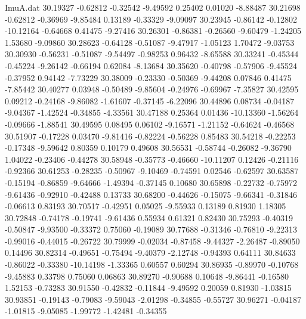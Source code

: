 \begin{filecontents}{ImuA.dat}
  30.19327   -0.62812   -0.32542   -9.49592    0.25402    0.01020   -8.88487
  30.21698   -0.62812   -0.36969   -9.85484    0.13189   -0.33329   -9.09097
  30.23945   -0.86142   -0.12802  -10.12164   -0.64668    0.41475   -9.27416
  30.26301   -0.86381   -0.26560   -9.60479   -1.24205    1.53680   -9.09860
  30.28623   -0.64128   -0.51087   -9.47917   -1.05123    1.70472   -9.03753
  30.30930   -0.56231   -0.51087   -9.54497   -0.98253    0.96432   -8.65588
  30.33241   -0.45344   -0.45224   -9.26142   -0.66194    0.62084   -8.13684
  30.35620   -0.40798   -0.57906   -9.45524   -0.37952    0.94142   -7.73229
  30.38009   -0.23330   -0.50369   -9.44208    0.07846    0.41475   -7.85442
  30.40277    0.03948   -0.50489   -9.85604   -0.24976   -0.69967   -7.35827
  30.42595    0.09212   -0.24168   -9.86082   -1.61607   -0.37145   -6.22096
  30.44896    0.08734   -0.04187   -9.04367   -1.42524   -0.34855   -4.33561
  30.47188    0.25364    0.01436  -10.13360   -1.56264   -0.09666   -1.88541
  30.49595    0.08495    0.06102   -9.16571   -1.21152   -0.64624   -0.46568
  30.51907   -0.17228    0.03470   -9.81416   -0.82224   -0.56228    0.85483
  30.54218   -0.22253   -0.17348   -9.59642    0.80359    0.10179    0.49608
  30.56531   -0.58744   -0.26082   -9.36790    1.04022   -0.23406   -0.44278
  30.58948   -0.35773   -0.46660  -10.11207    0.12426   -0.21116   -0.92366
  30.61253   -0.28235   -0.50967   -9.10469   -0.74591    0.02546   -0.62597
  30.63587   -0.15194   -0.86859   -9.64666   -1.49394   -0.37145    0.10680
  30.65898   -0.22732   -0.75972   -9.61436   -0.92910   -0.42488    0.13733
  30.68200   -0.44626   -0.15075   -9.66341   -0.31846   -0.06613    0.83193
  30.70517   -0.42951    0.05025   -9.55933    0.13189    0.81930    1.18305
  30.72848   -0.74178   -0.19741   -9.61436    0.55934    0.61321    0.82430
  30.75293   -0.40319   -0.50847   -9.93500   -0.33372    0.75060   -0.19089
  30.77688   -0.31346   -0.76810   -9.22313   -0.99016   -0.44015   -0.26722
  30.79999   -0.02034   -0.87458   -9.44327   -2.26487   -0.89050    0.14496
  30.82314   -0.49651   -0.75494   -9.40379   -2.12748   -0.94393    0.64111
  30.84633   -0.86022   -0.33380  -10.14198   -1.33365    0.60557    0.60294
  30.86935   -0.89970   -0.10768   -9.45883    0.33798    0.75060    0.06863
  30.89270   -0.90688    0.10648   -9.86441   -0.16580    1.52153   -0.73283
  30.91550   -0.42832   -0.11844   -9.49592    0.20059    0.81930   -1.03815
  30.93851   -0.19143   -0.79083   -9.59043   -2.01298   -0.34855   -0.55727
  30.96271   -0.04187   -1.01815   -9.05085   -1.99772   -1.42481   -0.34355

\end{filecontents}
